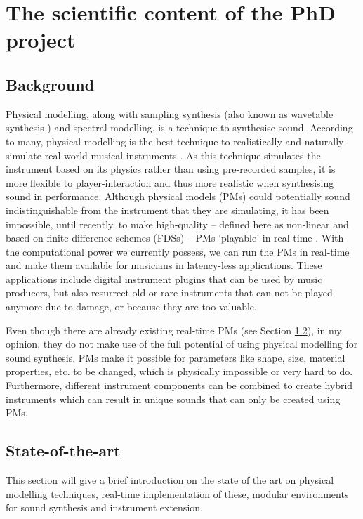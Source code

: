 \section{The scientific content of the PhD project}

\subsection{Background}
Physical modelling, along with sampling synthesis (also known as wavetable synthesis \cite{Smith2010a}) and spectral modelling, is a technique to synthesise sound. According to many, physical modelling is the best technique to realistically and naturally simulate real-world musical instruments \cite{Valimaki2006, Smith2010b, Bilbao2009}. As this technique simulates the instrument based on its physics rather than using pre-recorded samples, it is more flexible to player-interaction and thus more realistic when synthesising sound in performance. Although physical models (PMs) could potentially sound indistinguishable from the instrument that they are simulating, it has been impossible, until recently, to make high-quality -- defined here as non-linear and based on finite-difference schemes (FDSs) -- PMs ‘playable’ in real-time \cite{Smith2010a}. With the computational power we currently possess, we can run the PMs in real-time and make them available for musicians in latency-less applications. These applications include digital instrument plugins that can be used by music producers, but also resurrect old or rare instruments that can not be played anymore due to damage, or because they are too valuable. 

Even though there are already existing real-time PMs (see Section \ref{SOTA}), in my opinion, they do not make use of the full potential of using physical modelling for sound synthesis. PMs make it possible for parameters like shape, size, material properties, etc. to be changed, which is physically impossible or very hard to do. Furthermore, different instrument components can be combined to create hybrid instruments which can result in unique sounds that can only be created using PMs.

\subsection{State-of-the-art}\label{SOTA}
This section will give a brief introduction on the state of the art on physical modelling techniques, real-time implementation of these, modular environments for sound synthesis and instrument extension.

